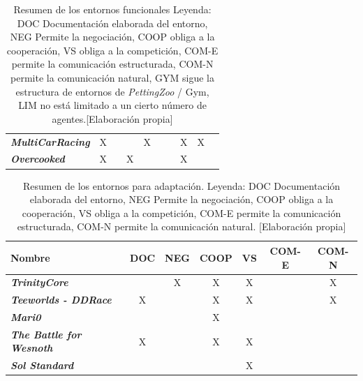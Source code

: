 \begin{table}[ht]
\begin{center}
\begin{tabular}{| l | c | c | c | c | c | c | c | c | c |}
			\textbf{\textit{MultiCarRacing}}       & X            &              &               & X           &                &                & X            & X            \\
			\textbf{\textit{Overcooked}}           & X            &              & X             &             &                &                & X            &              \\ \hline
		\end{tabular}
		\caption{Resumen de los entornos funcionales Leyenda: DOC Documentación elaborada del entorno, NEG Permite la negociación, COOP obliga a la cooperación, VS obliga a la competición, COM-E permite la comunicación estructurada, COM-N permite la comunicación natural, GYM sigue la estructura de entornos de \textit{PettingZoo} / Gym, LIM no está limitado a un cierto número de agentes.[Elaboración propia]}
		\label{tab:funcionales}
	\end{center}
\end{table}
\begin{table}[h]
	\begin{center}
		\begin{tabular}{| l | c | c | c | c | c | c |}
			\hline
			\textbf{Nombre}                 & \textbf{DOC} & \textbf{NEG} & \textbf{COOP} & \textbf{VS} & \textbf{COM-E} & \textbf{COM-N} \\ \hline
			\textbf{\textit{TrinityCore}}            &              & X            & X             & X           &                & X              \\
			\textbf{\textit{Teeworlds - DDRace}}     & X            &              & X             & X           &                & X              \\
			\textbf{\textit{Mari0}}                  &              &              & X             &             &                &                \\
			\textbf{\textit{The Battle for Wesnoth}} &  X            &              & X             & X           &                &                \\
			\textbf{\textit{Sol Standard}}           &              &              &               & X           &                &                \\
			\hline
		\end{tabular}
		\caption{Resumen de los entornos para adaptación. Leyenda: DOC Documentación elaborada del entorno, NEG Permite la negociación, COOP obliga a la cooperación, VS obliga a la competición, COM-E permite la comunicación estructurada, COM-N permite la comunicación natural. [Elaboración propia]}
		\label{tab:no-funcionales}
	\end{center}
\end{table}

